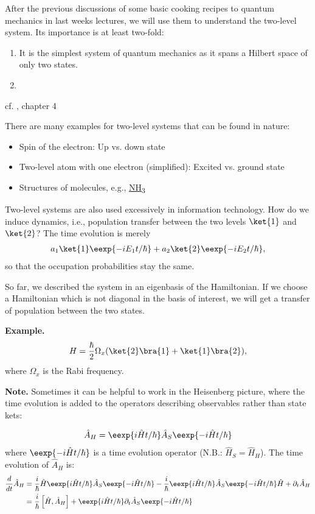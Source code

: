 After the previous discussions of some basic cooking recipes to quantum mechanics in last weeks lectures, we will use them to understand the two-level system. Its importance is at least two-fold:
\begin{enumerate}
\item It is the simplest system of quantum mechanics as it spans a Hilbert space of only two states.
\item 
\end{enumerate}

cf. \cite{1}, chapter 4

There are many examples for two-level systems that can be found in nature:
\begin{itemize}
	\item Spin of the electron: Up vs. down state
	\item Two-level atom with one electron (simplified): Excited vs. ground state
	\item Structures of molecules, e.g., \hyperref[fig:twostate]{NH\textsubscript{3}}
\end{itemize}
Two-level systems are also used excessively in information technology.
How do we induce dynamics, i.e., population transfer between the two levels $\ket{1}$ and $\ket{2}$? The time evolution is merely
		\begin{align}
			a_1\ket{1}\eexp{-i{E_1 t}/{\hbar}} + a_2\ket{2}\eexp{-i{E_2 t}/{\hbar}},
		\end{align}
		so that the occupation probabilities stay the same. 
		
		So far, we described the system in an eigenbasis of the Hamiltonian.
		If we choose a Hamiltonian which is not diagonal in the basis of interest, we will get a transfer of population between the two states.

\textbf{Example.}
\begin{align}
 H=\frac{\hbar}{2}\Omega_x(\ket{2}\bra{1} + \ket{1}\bra{2}),
\end{align}
where $\Omega_x$ is the Rabi frequency.

\textbf{Note.} Sometimes it can be helpful to work in the Heisenberg picture, where the time evolution is added to the operators describing observables rather than state kets:

\begin{align}
	\hat{A}_H=\eexp{i{\hat{H} t}/{\hbar}} \hat{A}_S \eexp{-i{\hat{H} t}/{\hbar}}
\end{align}
where $\eexp{-i{\hat{H} t}/{\hbar}}$ is a time evolution operator (N.B.: $\hat{H}_S = \hat{H}_H$). The time evolution of $\hat{A}_H$ is:
\begin{align}
 \notag \frac{d}{dt} \hat{A}_H &= \frac{i}{\hbar}\hat{H}\eexp{i{\hat{H}t}/{\hbar}}\hat{A}_S \eexp{-i{\hat{H} t}/{\hbar}}-\frac{i}{\hbar} \eexp{i{\hat{H} t}/{\hbar}}\hat{A}_S \eexp{-i{\hat{H}t}/{\hbar}}\hat{H}+\partial_t\hat{A}_H\\
&= \frac{i}{\hbar}\left[\hat{H},\hat{A}_H\right] + \eexp{i{\hat{H}t}/{\hbar}}\partial_t\hat{A}_S\eexp{-i{\hat{H}t}/{\hbar}}
 \end{align}

